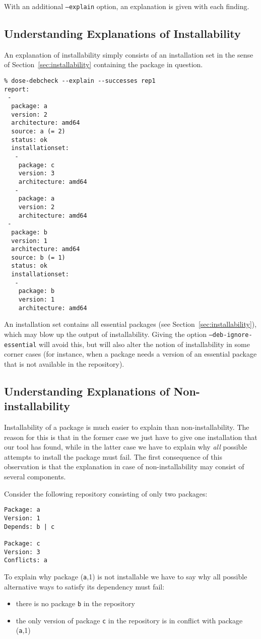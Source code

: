 With an additional \texttt{--explain} option, an explanation is given
with each finding. 

\subsection{Understanding Explanations of Installability}

An explanation of installability simply consists of an
installation set in the sense of Section~\ref{sec:installability}
containing the package in question.

\begin{example}
\begin{verbatim}
% dose-debcheck --explain --successes rep1
report:
 -
  package: a
  version: 2
  architecture: amd64
  source: a (= 2)
  status: ok
  installationset:
   -
    package: c
    version: 3
    architecture: amd64
   -
    package: a
    version: 2
    architecture: amd64
 -
  package: b
  version: 1
  architecture: amd64
  source: b (= 1)
  status: ok
  installationset:
   -
    package: b
    version: 1
    architecture: amd64
\end{verbatim}
\end{example}

An installation set contains all essential packages (see
Section~\ref{sec:installability}), which may blow up the output of
installability. Giving the option \texttt{--deb-ignore-essential} will
avoid this, but will also alter the notion of installability in some
corner cases (for instance, when a package needs a version of an
essential package that is not available in the repository).

\subsection{Understanding Explanations of Non-installability}

Installability of a package is much easier to explain than
non-installability. The reason for this is that in the former case we
just have to give one installation that our tool has found, while in
the latter case we have to explain why \emph{all} possible attempts to
install the package must fail. The first consequence of this
observation is that the explanation in case of non-installability may
consist of several components.

\begin{example}
  Consider the following repository consisting of only two packages:
\begin{verbatim}
Package: a
Version: 1
Depends: b | c

Package: c
Version: 3
Conflicts: a
\end{verbatim}
To explain why package (\texttt{a},1) is not installable we have to
say why all possible alternative ways to satisfy its dependency must
fail:
\begin{itemize}
\item there is no package \texttt{b} in the repository
\item the only version of package \texttt{c} in the repository is in
  conflict with package (\texttt{a},1)
\end{itemize}
\end{example}

